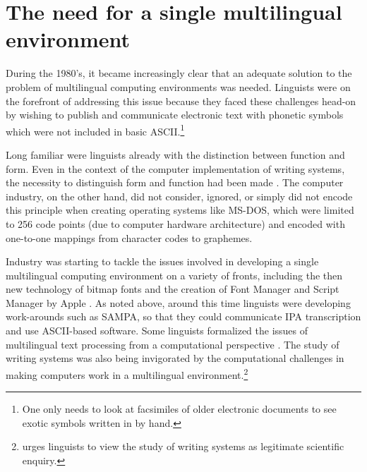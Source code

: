\section{The need for a single multilingual environment}

During the 1980's, it became increasingly clear that an adequate solution 
to the problem of multilingual computing environments was needed. Linguists 
were on the forefront of addressing this issue because they faced these 
challenges head-on by wishing to publish and communicate electronic text 
with phonetic symbols which were not included in basic ASCII.\footnote{One 
only needs to look at facsimiles of older electronic documents to see exotic 
symbols written in by hand.}

Long familiar were linguists already with the distinction between function 
and form. Even in the context of the computer implementation of writing systems, 
the necessity to distinguish form and function had been made \citep{Becker1984}. 
The computer industry, on the other hand, did not consider, ignored, or simply 
did not encode this principle when creating operating systems like MS-DOS, which 
were limited to 256 code points (due to computer hardware architecture) and 
encoded with one-to-one mappings from character codes to graphemes.

Industry was starting to tackle the issues involved in developing a single 
multilingual computing environment on a variety of fronts, including the then 
new technology of bitmap fonts and the creation of Font Manager and Script 
Manager by Apple \citep{Apple1985,Apple1986,Apple1988}. As noted above, around 
this time linguists were developing work-arounds such as SAMPA, so that they 
could communicate IPA transcription and use ASCII-based software. Some linguists 
formalized the issues of multilingual text processing from a computational 
perspective \citep{Anderson1984,Becker1984,Simons1989}. The study of writing 
systems was also being invigorated by the computational challenges in making 
computers work in a multilingual environment.\footnote{\cite[11--15]{Sampson1985} 
urges linguists to view the study of writing systems as legitimate scientific enquiry.}


